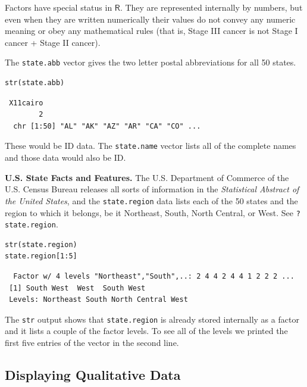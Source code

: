\documentclass[captions=tableheading]{scrbook}
\begin{document}
Factors have special status in \(\mathsf{R}\). They are represented internally by numbers, but even when they are written numerically their values do not convey any numeric meaning or obey any mathematical rules (that is, Stage III cancer is not Stage I cancer + Stage II cancer).

\begin{example}
The \texttt{state.abb}
vector gives the two letter postal abbreviations for all 50 states.


\begin{verbatim}
str(state.abb)
\end{verbatim}

\begin{verbatim}
 X11cairo 
        2
  chr [1:50] "AL" "AK" "AZ" "AR" "CA" "CO" ...
\end{verbatim}

These would be ID data. The \texttt{state.name} vector lists all of the complete names and those data would also be ID.
\end{example}

\begin{example}
\textbf{U.S. State Facts and Features.} The U.S. Department of Commerce of the U.S. Census Bureau releases all sorts of information in the \emph{Statistical Abstract of the United States}, and the \texttt{state.region} data lists each of the 50 states and the region to which it belongs, be it Northeast, South, North Central, or West. See \texttt{?state.region}.


\begin{verbatim}
str(state.region)
state.region[1:5]
\end{verbatim}

\begin{verbatim}
  Factor w/ 4 levels "Northeast","South",..: 2 4 4 2 4 4 1 2 2 2 ...
 [1] South West  West  South West 
 Levels: Northeast South North Central West
\end{verbatim}

The \texttt{str} output shows that \texttt{state.region} is already stored internally as a factor and it lists a couple of the factor levels. To see all of the levels we printed the first five entries of the vector in the second line.
\end{example}
\subsection{Displaying Qualitative Data}
\label{sec-2-1-4}
\label{sub:Displaying-Qualitative-Data}
\end{document}
